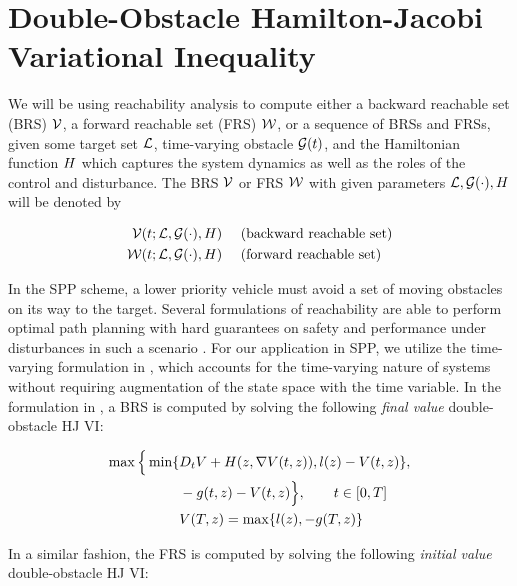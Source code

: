 \section{Double-Obstacle Hamilton-Jacobi Variational Inequality \label{sec:HJIVI}}
We will be using reachability analysis to compute either a backward reachable set (BRS) $\mathcal{V}$, a forward reachable set (FRS) $\mathcal{W}$, or a sequence of BRSs and FRSs, given some target set $\mathcal{L}$, time-varying obstacle $\mathcal{G}(t)$, and the Hamiltonian function $H$ which captures the system dynamics as well as the roles of the control and disturbance. The BRS $\mathcal{V}$ or FRS $\mathcal{W}$ with given parameters $\mathcal{L}, \mathcal{G}(\cdot), H$ will be denoted by

\begin{equation}
\begin{aligned}
\mathcal{V}(t; \mathcal{L}, \mathcal{G}(\cdot), H) &\quad \text{ (backward reachable set)}\\
\mathcal{W}(t; \mathcal{L}, \mathcal{G}(\cdot), H) &\quad \text{ (forward reachable set)}
\end{aligned}
\end{equation}

In the SPP scheme, a lower priority vehicle must avoid a set of moving obstacles on its way to the target. Several formulations of reachability are able to perform optimal path planning with hard guarantees on safety and performance under disturbances in such a scenario \cite{}. For our application in SPP, we utilize the time-varying formulation in \cite{}, which accounts for the time-varying nature of systems without requiring augmentation of the state space with the time variable. In the formulation in \cite{}, a BRS is computed by solving the following \textit{final value} double-obstacle HJ VI:

\begin{equation}
\label{eq:HJIVI_BRS}
\begin{aligned}
\max \Big\{ \min \{&D_t \valfunc + \ham(\state, \nabla \valfunc(t, \state)), \fc(\state) - \valfunc(t, \state) \}, \\
&-\obsfunc(t, \state) - \valfunc(t, \state) \Big\}, \qquad t \in [0, T] \\
&\valfunc(T, \state) = \max\{\fc(\state), -\obsfunc(T, \state)\}
\end{aligned}
\end{equation}

In a similar fashion, the FRS is computed by solving the following \textit{initial value} double-obstacle HJ VI:


